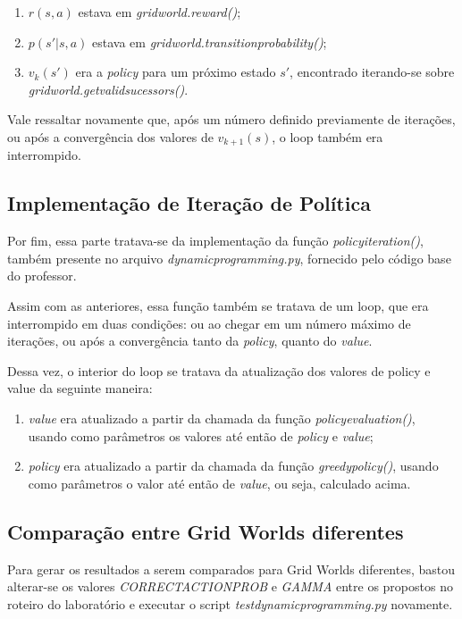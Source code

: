 \documentclass[conference]{IEEEtran}
\begin{document}
\begin{enumerate}
\item $r \left ( s, a \right )$ estava em \textit{grid\underline{\space}world.reward()};

\item $p \left ( s' | s, a \right )$ estava em \textit{grid\underline{\space}world.transition\underline{\space}probability()};

\item $v_k \left ( s' \right )$ era a \textit{policy} para um próximo estado $s'$, encontrado iterando-se sobre \textit{grid\underline{\space}world.get\underline{\space}valid\underline{\space}sucessors()}.
\end{enumerate}

Vale ressaltar novamente que, após um número definido previamente de iterações, ou após a convergência dos valores de $v_{k+1}(s)$, o loop também era interrompido.

\subsection{Implementação de Iteração de Política}
Por fim, essa parte tratava-se da implementação da função \textit{policy\underline{\space}iteration()}, também presente no arquivo \textit{dynamic\underline{\space}programming.py}, fornecido pelo código base do professor.

Assim com as anteriores, essa função também se tratava de um loop, que era interrompido em duas condições: ou ao chegar em um número máximo de iterações, ou após a convergência tanto da \textit{policy}, quanto do \textit{value}.

Dessa vez, o interior do loop se tratava da atualização dos valores de policy e value da seguinte maneira:

\begin{enumerate}
\item \textit{value} era atualizado a partir da chamada da função \textit{policy\underline{\space}evaluation()}, usando como parâmetros os valores até então de \textit{policy} e \textit{value};

\item \textit{policy} era atualizado a partir da chamada da função \textit{greedy\underline{\space}policy()}, usando como parâmetros o valor até então de \textit{value}, ou seja, calculado acima.
\end{enumerate}

\subsection{Comparação entre Grid Worlds diferentes}
Para gerar os resultados a serem comparados para Grid Worlds diferentes, bastou alterar-se os valores \textit{CORRECT\underline{\space}ACTION\underline{\space}PROB} e \textit{GAMMA} entre os propostos no roteiro do laboratório \cite{roteiro} e executar o script \textit{test\underline{\space}dynamic\underline{\space}programming.py} novamente.
\end{document}
